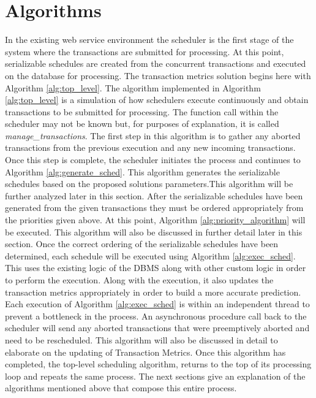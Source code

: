 \documentclass[conference]{IEEEtran}
\begin{document}
\section{Algorithms}
\label{sec:algorithms}
In the existing web service environment the scheduler is the first stage of the system where the transactions are submitted for processing. At this point, serializable schedules are created from the concurrent transactions and executed on the database for processing. The transaction metrics solution begins here with Algorithm \ref{alg:top_level}. The algorithm implemented in Algorithm \ref{alg:top_level} is a simulation of how schedulers execute continuously and obtain transactions to be submitted for processing. The function call within the scheduler may not be known but, for purposes of explanation, it is called \textit{manage\_transactions}. The first step in this algorithm is to gather any aborted transactions from the previous execution and any new incoming transactions. Once this step is complete, the scheduler initiates the process and continues to Algorithm \ref{alg:generate_sched}. This algorithm generates the serializable schedules based on the proposed solutions parameters.This algorithm will be further analyzed later in this section. After the serializable schedules have been generated from the given transactions they must be ordered appropriately from the priorities given above. At this point, Algorithm \ref{alg:priority_algorithm} will be executed. This algorithm will also be discussed in further detail later in this section. Once the correct ordering of the serializable schedules have been determined, each schedule will be executed using Algorithm \ref{alg:exec_sched}. This uses the existing logic of the DBMS along with other custom logic in order to perform the execution. Along with the execution, it also updates the transaction metrics appropriately in order to build a more accurate prediction. Each execution of Algorithm \ref{alg:exec_sched} is within an independent thread to prevent a bottleneck in the process. An asynchronous procedure call back to the scheduler will send any aborted transactions that were preemptively aborted and need to be rescheduled. This algorithm will also be discussed in detail to elaborate on the updating of Transaction Metrics. Once this algorithm has completed, the top-level scheduling algorithm, returns to the top of its processing loop and repeats the same process. The next sections give an explanation of the algorithms mentioned above that compose this entire process.
\end{document}
